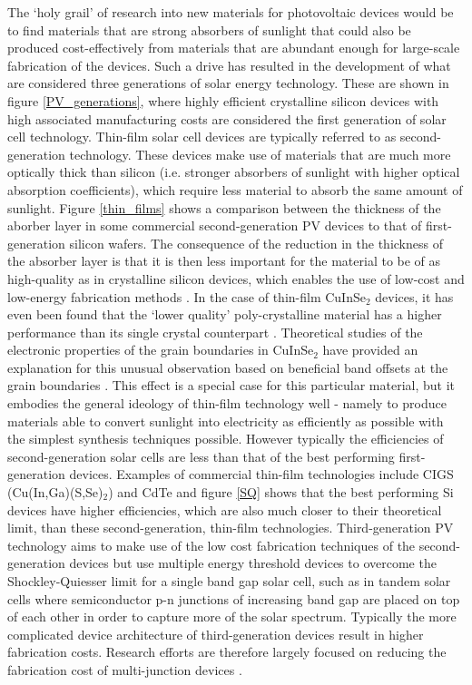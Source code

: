 The `holy grail' of research into new materials for photovoltaic devices would be to find materials that are strong absorbers of sunlight that could also be produced cost-effectively from materials that are abundant enough for large-scale fabrication of the devices. Such a drive has resulted in the development of what are considered three generations of solar energy technology. These are shown in figure \ref{PV_generations}, where highly efficient crystalline silicon devices with high associated manufacturing costs are considered the first generation of solar cell technology.
Thin-film solar cell devices are typically referred to as second-generation technology. These devices make use of materials that are much more optically thick than silicon (i.e. stronger absorbers of sunlight with higher optical absorption coefficients), which require less material to absorb the same amount of sunlight. Figure \ref{thin_films} shows a comparison between the thickness of the aborber layer in some commercial second-generation PV devices to that of first-generation silicon wafers. The consequence of the reduction in the thickness of the absorber layer is that it is then less important for the material to be of as high-quality as in crystalline silicon devices, which enables the use of low-cost and low-energy fabrication methods \cite{emerging_pv}. 
In the case of thin-film CuInSe$_2$ devices, it has even been found that the `lower quality' poly-crystalline material has a higher performance than its single crystal counterpart \cite{CIS1_3, CIS1_4}. Theoretical studies of the electronic properties of the grain boundaries in CuInSe$_2$ have provided an explanation for this unusual observation based on beneficial band offsets at the grain boundaries \cite{CIS1, CIS2}. This effect is a special case for this particular material, but it embodies the general ideology of thin-film technology well - namely to produce materials able to convert sunlight into electricity as efficiently as possible with the simplest synthesis techniques possible.
However typically the efficiencies of second-generation solar cells are less than that of the best performing first-generation devices. Examples of commercial thin-film technologies include CIGS (Cu(In,Ga)(S,Se)$_2$) and CdTe and figure \ref{SQ} shows that the best performing Si devices have higher efficiencies, which are also much closer to their theoretical limit, than these second-generation, thin-film technologies.
Third-generation PV technology aims to make use of the low cost fabrication techniques of the second-generation devices but use multiple energy threshold devices to overcome the Shockley-Quiesser limit for a single band gap solar cell, such as in tandem solar cells where semiconductor p-n junctions of increasing band gap are placed on top of each other in order to capture more of the solar spectrum. Typically the more complicated device architecture of third-generation devices result in higher fabrication costs. Research efforts are therefore largely focused on reducing the fabrication cost of multi-junction devices \cite{3rd_gen}.

